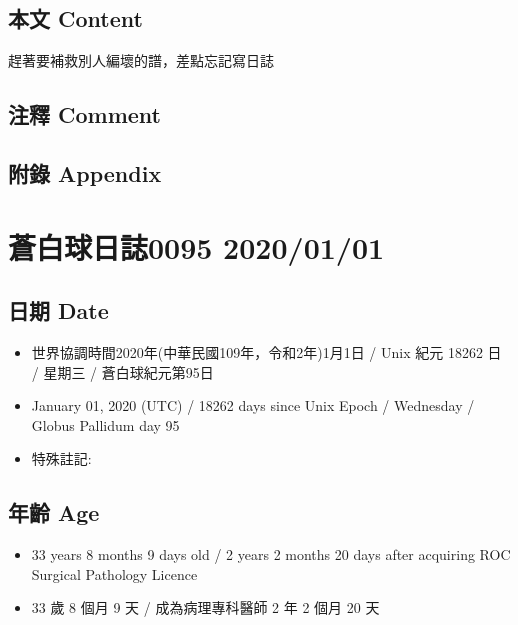 \documentclass[a5paper, 12pt
]{book}
\providecommand{\tightlist}{%
  \setlength{\itemsep}{0pt}\setlength{\parskip}{0pt}}
\begin{document}
\hypertarget{ux672cux6587-content-30}{%
\subsection{本文 Content}\label{ux672cux6587-content-30}}

趕著要補救別人編壞的譜，差點忘記寫日誌

\hypertarget{ux6ce8ux91cb-comment-29}{%
\subsection{注釋 Comment}\label{ux6ce8ux91cb-comment-29}}

\hypertarget{ux9644ux9304-appendix-30}{%
\subsection{附錄 Appendix}\label{ux9644ux9304-appendix-30}}

\hypertarget{ux84bcux767dux7403ux65e5ux8a8c0095-20200101}{%
\section{蒼白球日誌0095
2020/01/01}\label{ux84bcux767dux7403ux65e5ux8a8c0095-20200101}}

\hypertarget{ux65e5ux671f-date-31}{%
\subsection{日期 Date}\label{ux65e5ux671f-date-31}}

\begin{itemize}
\tightlist
\item
  世界協調時間2020年(中華民國109年，令和2年)1月1日 / Unix 紀元 18262 日
  / 星期三 / 蒼白球紀元第95日
\item
  January 01, 2020 (UTC) / 18262 days since Unix Epoch / Wednesday /
  Globus Pallidum day 95
\item
  特殊註記:
\end{itemize}

\hypertarget{ux5e74ux9f61-age-31}{%
\subsection{年齡 Age}\label{ux5e74ux9f61-age-31}}

\begin{itemize}
\tightlist
\item
  33 years 8 months 9 days old / 2 years 2 months 20 days after
  acquiring ROC Surgical Pathology Licence
\item
  33 歲 8 個月 9 天 / 成為病理專科醫師 2 年 2 個月 20 天
\end{itemize}
\end{document}
